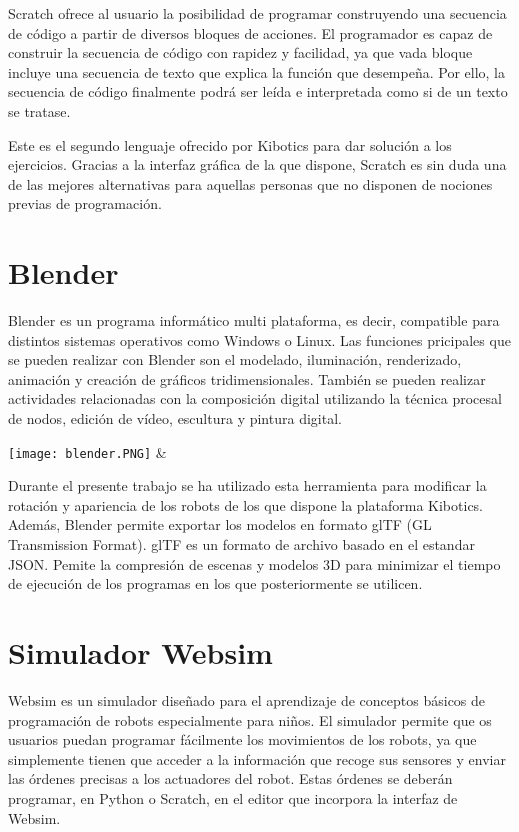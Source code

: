 Scratch ofrece al usuario la posibilidad de programar construyendo una secuencia de código a partir de diversos bloques de acciones. El programador es capaz de construir la secuencia de código con rapidez y facilidad, ya que vada bloque incluye una secuencia de texto que explica la función que desempeña. Por ello, la secuencia de código finalmente podrá ser leída e interpretada como si de un texto se tratase. \newline

Este es el segundo lenguaje ofrecido por Kibotics para dar solución a los ejercicios. Gracias a la interfaz gráfica de la que dispone, Scratch es sin duda una de las mejores alternativas para aquellas personas que no disponen de nociones previas de programación.

\section{Blender}
Blender es un programa informático multi plataforma, es decir, compatible para distintos sistemas operativos como Windows o Linux. Las funciones pricipales que se pueden realizar con Blender son el modelado, iluminación, renderizado, animación y creación de gráficos tridimensionales. También se pueden realizar actividades relacionadas con la composición digital utilizando la técnica procesal de nodos, edición de vídeo, escultura y pintura digital. \newline

\texttt{[image: blender.PNG]} & \newline

Durante el presente trabajo se ha utilizado esta herramienta para modificar la rotación y apariencia de los robots de los que dispone la plataforma Kibotics. Además, Blender permite exportar los modelos en formato glTF (GL Transmission Format). glTF es un formato de archivo basado en el estandar JSON. Pemite la compresión de escenas y modelos 3D para minimizar el tiempo de ejecución de los programas en los que posteriormente se utilicen.

\section{Simulador Websim}
Websim es un simulador diseñado para el aprendizaje de conceptos básicos de programación de robots especialmente para niños. El simulador permite que os usuarios puedan programar fácilmente los movimientos de los robots, ya que simplemente tienen que acceder a la información que recoge sus sensores y enviar las órdenes precisas a los actuadores del robot. Estas órdenes se deberán programar, en Python o Scratch, en el editor que incorpora la interfaz de Websim. \newline

